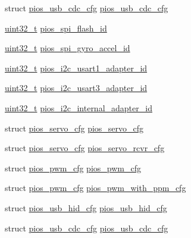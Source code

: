 \begin{DoxyCompactItemize}
\item 
struct \hyperlink{structpios__usb__cdc__cfg}{pios\-\_\-usb\-\_\-cdc\-\_\-cfg} \hyperlink{group___tau_labs_core_ga05cc3e449d417c7f9097d2659e6f5ca3}{pios\-\_\-usb\-\_\-cdc\-\_\-cfg}
\item 
\hyperlink{stdint_8h_a435d1572bf3f880d55459d9805097f62}{uint32\-\_\-t} \hyperlink{group___tau_labs_core_gaebc54f2c5fc298fad979df4d9bd1414b}{pios\-\_\-spi\-\_\-flash\-\_\-id}
\item 
\hyperlink{stdint_8h_a435d1572bf3f880d55459d9805097f62}{uint32\-\_\-t} \hyperlink{group___tau_labs_core_ga865a74a9b199b06803aec5b185719d6d}{pios\-\_\-spi\-\_\-gyro\-\_\-accel\-\_\-id}
\item 
\hyperlink{stdint_8h_a435d1572bf3f880d55459d9805097f62}{uint32\-\_\-t} \hyperlink{group___tau_labs_core_ga29c6942e2bb055cc6d2a15ac205c540b}{pios\-\_\-i2c\-\_\-usart1\-\_\-adapter\-\_\-id}
\item 
\hyperlink{stdint_8h_a435d1572bf3f880d55459d9805097f62}{uint32\-\_\-t} \hyperlink{group___tau_labs_core_gacf440a27cf365a1dadff460dd8162422}{pios\-\_\-i2c\-\_\-usart3\-\_\-adapter\-\_\-id}
\item 
\hyperlink{stdint_8h_a435d1572bf3f880d55459d9805097f62}{uint32\-\_\-t} \hyperlink{group___tau_labs_core_ga55974b8a985ecdc9dfed8c0962c36dd8}{pios\-\_\-i2c\-\_\-internal\-\_\-adapter\-\_\-id}
\item 
struct \hyperlink{structpios__servo__cfg}{pios\-\_\-servo\-\_\-cfg} \hyperlink{group___tau_labs_core_ga57a87ef16d7949a9cc3589efc8d88a28}{pios\-\_\-servo\-\_\-cfg}
\item 
struct \hyperlink{structpios__servo__cfg}{pios\-\_\-servo\-\_\-cfg} \hyperlink{group___tau_labs_core_gaa111328ef9a12c806ed1c24b93d4f663}{pios\-\_\-servo\-\_\-rcvr\-\_\-cfg}
\item 
struct \hyperlink{structpios__pwm__cfg}{pios\-\_\-pwm\-\_\-cfg} \hyperlink{group___tau_labs_core_ga7587f8e174df90bef8cec1edfa9e14c1}{pios\-\_\-pwm\-\_\-cfg}
\item 
struct \hyperlink{structpios__pwm__cfg}{pios\-\_\-pwm\-\_\-cfg} \hyperlink{group___tau_labs_core_ga6a7a8338c617f18384f3b3c5678f5505}{pios\-\_\-pwm\-\_\-with\-\_\-ppm\-\_\-cfg}
\item 
struct \hyperlink{structpios__usb__hid__cfg}{pios\-\_\-usb\-\_\-hid\-\_\-cfg} \hyperlink{group___tau_labs_core_ga3665f6d3a2cccc431b55b9432291e94c}{pios\-\_\-usb\-\_\-hid\-\_\-cfg}
\item 
struct \hyperlink{structpios__usb__cdc__cfg}{pios\-\_\-usb\-\_\-cdc\-\_\-cfg} \hyperlink{group___tau_labs_core_ga05cc3e449d417c7f9097d2659e6f5ca3}{pios\-\_\-usb\-\_\-cdc\-\_\-cfg}

\end{DoxyCompactItemize}
